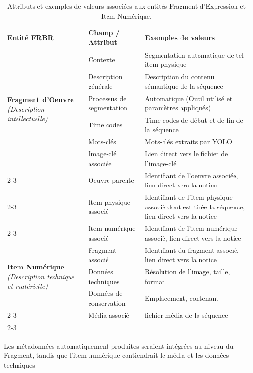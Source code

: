 \begin{table}[H]
	\centering
	\small
	\renewcommand{\arraystretch}{1.3}
	\begin{tabular}{|p{3.8cm}|p{4.2cm}|p{6.4cm}|}
		\hline
		\textbf{Entité FRBR} & \textbf{Champ / Attribut} & \textbf{Exemples de valeurs} \\
		\hline
		\multirow{6}{=}{\textbf{Fragment d’Oeuvre} \newline \textit{(Description intellectuelle)}} 
		& Contexte & Segmentation automatique de tel item physique \\ \cline{2-3}
		& Description générale & Description du contenu sémantique de la séquence \\ \cline{2-3}
		& Processus de segmentation & Automatique (Outil utilisé et paramètres appliqués) \\ \cline{2-3}
		& Time codes & Time codes de début et de fin de la séquence \\ \cline{2-3}
		& Mots-clés & Mots-clés extraits par YOLO \\ \cline{2-3}
		& Image-clé associée & Lien direct vers le fichier de l'image-clé \\ \cline{2-3}
		& Oeuvre parente & Identifiant de l'oeuvre associée, lien direct vers la notice \\ \cline{2-3}
		& Item physique associé & Identifiant de l'item physique associé dont est tirée la séquence, lien direct vers la notice \\ \cline{2-3}
		& Item numérique associé & Identifiant de l'item numérique associé, lien direct vers la notice \\ 
		\hline
		\multirow{3}{=}{\textbf{Item Numérique} \newline \textit{(Description technique et matérielle)}} 
		& Fragment associé & Identifiant du fragment associé, lien direct vers la notice \\ \cline{2-3}
		& Données techniques & Résolution de l'image, taille, format \\ \cline{2-3}
		& Données de conservation & Emplacement, contenant \\ \cline{2-3}
		& Média associé & fichier média de la séquence \\ \cline{2-3}
		\hline
	\end{tabular}
	\caption{Attributs et exemples de valeurs associées aux entités Fragment d'Expression et Item Numérique.}
	\label{tab:reversement_metadonnees_frbr}
\end{table}

Les métadonnées automatiquement produites seraient intégrées au niveau du Fragment, tandis que l'\gls{item} numérique contiendrait le média et les données techniques. 

